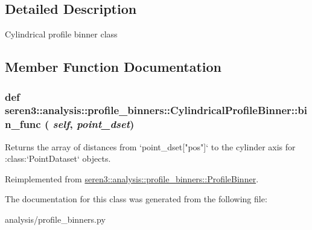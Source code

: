 \subsection{Detailed Description}
\begin{DoxyVerb}
Cylindrical profile binner class

\end{DoxyVerb}
 

\subsection{Member Function Documentation}
\hypertarget{classseren3_1_1analysis_1_1profile__binners_1_1CylindricalProfileBinner_acb88f7dd79081c517e3eb260226d096d}{
\subsubsection[{bin\_\-func}]{\setlength{\rightskip}{0pt plus 5cm}def seren3::analysis::profile\_\-binners::CylindricalProfileBinner::bin\_\-func ( {\em self}, \/   {\em point\_\-dset})}}
\label{classseren3_1_1analysis_1_1profile__binners_1_1CylindricalProfileBinner_acb88f7dd79081c517e3eb260226d096d}
\begin{DoxyVerb}Returns the array of distances from `point_dset["pos"]` to
the cylinder axis for :class:`PointDataset` objects.
\end{DoxyVerb}
 

Reimplemented from \hyperlink{classseren3_1_1analysis_1_1profile__binners_1_1ProfileBinner}{seren3::analysis::profile\_\-binners::ProfileBinner}.

The documentation for this class was generated from the following file:\begin{DoxyCompactItemize}
\item 
analysis/profile\_\-binners.py\end{DoxyCompactItemize}
